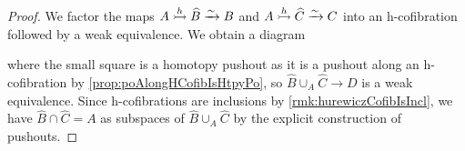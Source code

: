 \begin{prop}
\begin{proof}
        We factor the maps $A\xtailrightarrow{h}\widehat{B}\xrightarrow{\sim} B$ and $A\xtailrightarrow{h}\widehat{C}\xrightarrow{\sim} C$ into an h-cofibration followed by a weak equivalence.
        We obtain a diagram
        \begin{center}
        \end{center}
        where the small square is a homotopy pushout as it is a pushout along an h-cofibration by \cref{prop:poAlongHCofibIsHtpyPo}, so $\widehat{B}\cup_A\widehat{C}\to D$ is a weak equivalence.
        Since h-cofibrations are inclusions by \cref{rmk:hurewiczCofibIsIncl}, we have $\widehat{B}\cap\widehat{C}=A$ as subspaces of $\widehat{B}\cup_A\widehat{C}$ by the explicit construction of pushouts.


\end{proof}
\end{prop}
